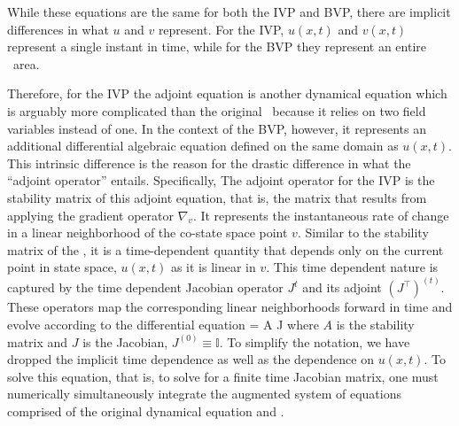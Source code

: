 While these equations are the same for both the IVP and BVP, there are implicit differences
in what $u$ and $v$ represent. For the IVP, $u(x, t)$ and $v(x,t)$ represent
a single instant in time, while for the BVP they represent an entire \spt\ area.

Therefore, for the IVP the adjoint equation is another dynamical equation which is arguably
more complicated than the original \KSe\ because it relies on two field variables instead
of one. In the context of the BVP, however, it represents an additional differential algebraic
equation defined on the same domain as $u(x,t)$. This intrinsic difference is the reason
for the drastic difference in what the ``adjoint operator'' entails. Specifically,
The adjoint operator for the IVP is the stability matrix of this adjoint
equation, that is, the matrix that results from applying the
gradient operator $\nabla_v$.
It represents the instantaneous rate of change in a linear neighborhood
of the co-state space point $v$.  Similar to the stability matrix of the
\KSe, it is a time-dependent quantity that depends only on the current point in
state space, $u(x,t)$ as it is linear in $v$. This time dependent nature is
captured by the time dependent Jacobian operator $J^t$ and its adjoint $(J^{\top})^(t)$.
These operators map the corresponding linear neighborhoods forward in time
and evolve according to the differential equation
\beq \label{jacobiandot}
 = A J
\eeq
where $A$ is the stability matrix and $J$ is the Jacobian, $J^(0) \equiv \mathbb{I}$.
To simplify the notation, we have dropped the implicit time dependence as well as the
dependence on $u(x,t)$. To solve this equation, that is, to solve for a finite time Jacobian
matrix, one must numerically simultaneously integrate the augmented system of equations comprised
of the original dynamical equation and . 